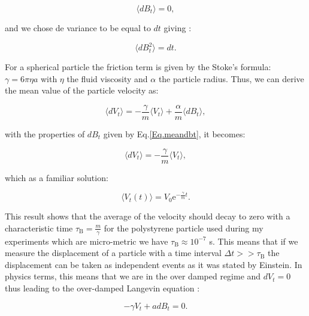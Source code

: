 \begin{equation}
	\langle dB_t \rangle  = 0,
	\label{Eq.meandbt}
\end{equation}

and we chose de variance to be equal to $dt$ giving : 

\begin{equation}
	\langle dB_t ^2 \rangle = dt.
\end{equation}

For a spherical particle the friction term is given by the Stoke's formula: $\gamma = 6\pi \eta a$ with $\eta$ the fluid viscosity and $\alpha$ the particle radius. Thus, we can derive the mean value of the particle velocity as:


\begin{equation}
	\langle dV_t \rangle = - \frac{\gamma}{m} \langle V_t \rangle + \frac{\alpha}{m} \langle dB_t \rangle,
\end{equation}

with the properties of $dB_t$ given by Eq.\ref{Eq.meandbt}, it becomes:

\begin{equation}
	\langle dV_t \rangle = - \frac{\gamma}{m} \langle V_t \rangle ,
\end{equation}

which as a familiar solution:

\begin{equation}
	\langle V_t (t) \rangle =   V_0 \mathrm{e}^{-\frac{\gamma}{m} t}.
	\label{Eq.int_V_langevin}
\end{equation}

This result shows that the average of the velocity should decay to zero with a characteristic time $\tau _\mathrm{B} = \frac{m}{\gamma}$ for the polystyrene  particle used during my experiments which are micro-metric we have $\tau_\mathrm{B} \approx 10^{-7}$ s. This means that if we measure the displacement of a particle with a time interval $ \Delta t  >> \tau _\mathrm{B} $ the displacement can be taken as independent events as it was stated by Einstein. In physics terms, this means that we are in the over damped regime and $dV_t = 0$ thus leading to the over-damped Langevin equation :

\begin{equation}
	-\gamma V_t  + adB_t = 0.
	\label{Eq.overdamped_SDE}
\end{equation}

